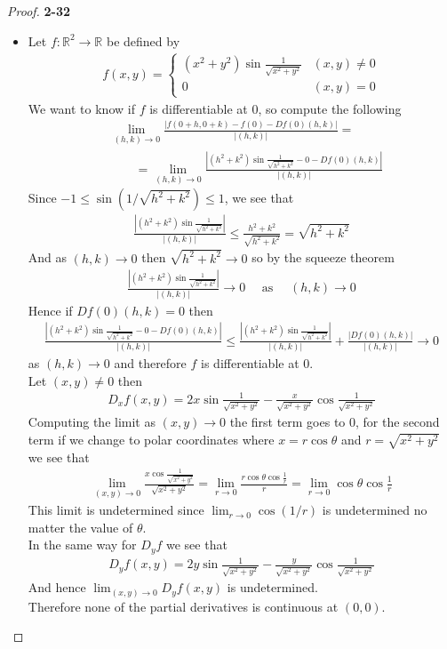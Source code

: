 \documentclass[11pt]{article}
\newcommand{\R}{\mathbb{R}}
\theoremstyle{definition}
\begin{document}
\begin{proof}{\textbf{2-32}}
\begin{itemize}
\cleardoublepage
\item [(b)] Let $f:\R^2 \to \R$ be defined by
\begin{align*}
    f(x,y) = \begin{cases}
        (x^2 + y^2)\sin\frac{1}{\sqrt{x^2 + y^2}} & (x,y)\neq 0\\
        0 & (x,y) = 0
    \end{cases}
\end{align*}
We want to know if $f$ is differentiable at 0, so compute the following
\begin{align*}
    &\lim_{(h,k)\to 0} \frac{|f(0+ h, 0 + k) - f(0) - Df(0)(h,k)|}{|(h,k)|} = \\
    &\qquad= \lim_{(h,k)\to 0}
    \frac{|(h^2 + k^2)\sin\frac{1}{\sqrt{h^2 + k^2}} - 0 - Df(0)(h,k)|}{|(h,k)|}
\end{align*}
Since $-1 \leq \sin (1/\sqrt{h^2 + k^2}) \leq 1$, we see that
\begin{align*}
    \frac{|(h^2 + k^2)\sin\frac{1}{\sqrt{h^2 + k^2}}|}{|(h,k)|}
    \leq \frac{h^2 + k^2}{\sqrt{h^2 + k^2}}
    = \sqrt{h^2 + k^2}
\end{align*}
And as $(h,k) \to 0$ then $\sqrt{h^2 + k^2} \to 0$ so by the squeeze theorem
\begin{align*}
    \frac{|(h^2 + k^2)\sin\frac{1}{\sqrt{h^2 + k^2}}|}{|(h,k)|} \to 0
    \quad \text{ as } \quad (h,k) \to 0
\end{align*}
Hence if $Df(0)(h,k) = 0$ then
\begin{align*}
    \frac{|(h^2 + k^2)\sin\frac{1}{\sqrt{h^2 + k^2}} - 0 - Df(0)(h,k)|}{|(h,k)|}
    \leq \frac{|(h^2 + k^2)\sin\frac{1}{\sqrt{h^2 + k^2}}|}{|(h,k)|}
    + \frac{|Df(0)(h,k)|}{|(h,k)|} \to 0
\end{align*}
as $(h,k) \to 0$ and therefore $f$ is differentiable at 0.\\
Let $(x,y) \neq 0$ then
\begin{align*}
    D_xf(x,y) = 2x\sin \frac{1}{\sqrt{x^2 + y^2}}
    - \frac{x}{\sqrt{x^2 + y^2}}\cos\frac{1}{\sqrt{x^2 + y^2}}
\end{align*}
Computing the limit as $(x,y) \to 0$ the first term goes to 0, for
the second term if we change to polar coordinates where $x = r\cos\theta$
and $r = \sqrt{x^2 + y^2}$ we see that
\begin{align*}
    \lim_{(x,y) \to 0} \frac{x\cos\frac{1}{\sqrt{x^2 + y^2}}}{\sqrt{x^2 + y^2}}
    = \lim_{r \to 0} \frac{r\cos\theta\cos\frac{1}{r}}{r}
    = \lim_{r \to 0} \cos\theta\cos\frac{1}{r}
\end{align*}
This limit is undetermined since $\lim_{r\to 0} \cos(1/r)$ is undetermined no
matter the value of $\theta$.\\
In the same way for $D_yf$ we see that
\begin{align*}
    D_yf(x,y) = 2y\sin \frac{1}{\sqrt{x^2 + y^2}}
    - \frac{y}{\sqrt{x^2 + y^2}}\cos\frac{1}{\sqrt{x^2 + y^2}}
\end{align*}
And hence $\lim_{(x,y)\to 0}D_yf(x,y)$ is undetermined.\\
Therefore none of the partial derivatives is continuous at $(0,0)$.
\end{itemize}
\end{proof}
\end{document}
